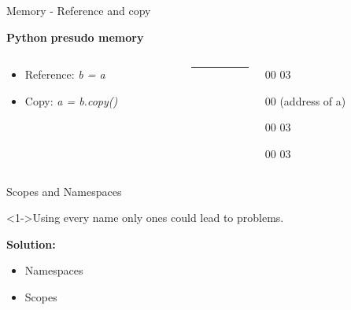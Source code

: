 \documentclass{beamer}
\begin{document}
\begin{frame}{Memory - Reference and copy}

    \textbf{Python} \hfill \textbf{presudo memory}
   
    \begin{columns}
        \begin{column}{0.49\textwidth}
            \begin{itemize}
                \item<1-> Reference: \textit{b = a}
                \item<3-> Copy: \textit{a = b.copy()}
            \end{itemize}
        \end{column}
        \begin{column}{.02\textwidth}
            \rule{.1mm}{0.7\textheight}
        \end{column}
        \begin{column}{0.49\textwidth}
            \begin{description}
                \item<2->[a (00)] 00 03
                \item<2->[b (01)] 00 (address of a)
                \item<4->[--]
                \item<4->[a (00)] 00 03
                \item<4->[b (01)] 00 03    
            \end{description}
        \end{column}

    \end{columns}

    
\end{frame}

\begin{frame}{Scopes and Namespaces}

    \begin{alertblock}<1->{Using every name only ones could lead to problems.}
    \end{alertblock} \pause
    \textbf{Solution:}

    \begin{itemize}
        \item<3-> Namespaces
        \item<4-> Scopes 
    \end{itemize}
    
\end{frame}
\end{document}
